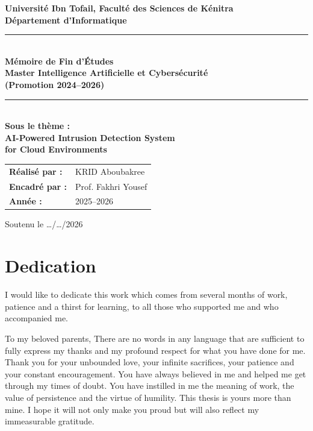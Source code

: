 \documentclass[12pt, a4paper, oneside]{report}
\begin{document}
\begin{titlepage}
  \centering
  \vspace*{1cm}
  {\Large\bfseries Université Ibn Tofail, Faculté des Sciences de Kénitra\\[0.5em]
  Département d'Informatique\\[1em]}
  \rule{\textwidth}{1pt}\\[1em]
  {\LARGE\bfseries Mémoire de Fin d'Études\\[0.5em]
  Master Intelligence Artificielle et Cybersécurité\\[0.3em]
  (Promotion 2024--2026)}\\[1.5em]
  \rule{\textwidth}{1pt}\\[2em]
  {\large\bfseries Sous le thème :}\\[1em]
  {\LARGE\bfseries AI-Powered Intrusion Detection System\\[0.4em]
  for Cloud Environments}\\[3em]
  \begin{tabular}{ll}
    \textbf{Réalisé par :}   & KRID Aboubakree\\[0.5em]
    \textbf{Encadré par :}   & Prof. Fakhri Yousef \\[0.5em]
    \textbf{Année :}         & 2025--2026 \\
  \end{tabular}
  \vfill
  {\large Soutenu le \ldots /\ldots /2026}
\end{titlepage}

\pagestyle{plain}

\chapter*{Dedication}

I would like to dedicate this work which comes from several months of work, patience and a thirst for learning, to all those who supported me and who accompanied me.

To my beloved parents, There are no words in any language that are sufficient to fully express my thanks and my profound respect for what you have done for me. Thank you for your unbounded love, your infinite sacrifices, your patience and your constant encouragement. You have always believed in me and helped me get through my times of doubt.
You have instilled in me the meaning of work, the value of persistence and the virtue of humility.
This thesis is yours more than mine. I hope it will not only make you proud but will also reflect my immeasurable gratitude.
\end{document}
